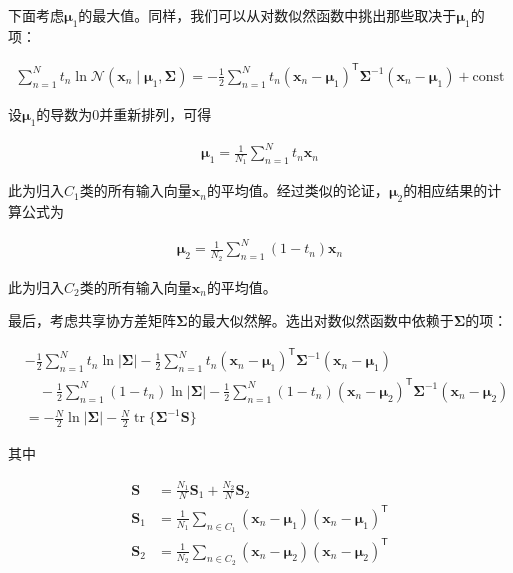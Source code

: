 \documentclass[../../main.tex]{subfiles}
\begin{document}
下面考虑$\boldsymbol{\mu}_1$的最大值。同样，我们可以从对数似然函数中挑出那些取决于$\boldsymbol{\mu}_1$的项：

\begin{align}
  \sum_{n=1}^{N}t_n\ln\mathcal{N}(\boldsymbol{x}_n\mid\boldsymbol{\mu}_1,\boldsymbol{\Sigma})=-\frac{1}{2}\sum_{n=1}^{N}t_n(\boldsymbol{x}_n-\boldsymbol{\mu}_1)^{\mathsf{T}}\boldsymbol{\Sigma}^{-1}(\boldsymbol{x}_n-\boldsymbol{\mu}_1)+\text{const}
  \label{align:ch05-均值项}
\end{align}

设$\boldsymbol{\mu}_1$的导数为0并重新排列，可得

\begin{align}
  \boldsymbol{\mu}_1=\frac{1}{N_1}\sum_{n=1}^{N}t_n\boldsymbol{x}_n
  \label{align:ch05-均值ML1}
\end{align}

此为归入$C_1$类的所有输入向量$\boldsymbol{x}_n$的平均值。经过类似的论证，$\boldsymbol{\mu}_2$的相应结果的计算公式为

\begin{align}
  \boldsymbol{\mu}_2=\frac{1}{N_2}\sum_{n=1}^{N}(1-t_n)\boldsymbol{x}_n
  \label{align:ch05-均值ML2}
\end{align}

此为归入$C_2$类的所有输入向量$\boldsymbol{x}_n$的平均值。

最后，考虑共享协方差矩阵$\boldsymbol{\Sigma}$的最大似然解。选出对数似然函数中依赖于$\boldsymbol{\Sigma}$的项：

\begin{align}
  &-\frac{1}{2}\sum_{n=1}^{N}t_n\ln\lvert\boldsymbol{\Sigma}\rvert-\frac{1}{2}\sum_{n=1}^{N}t_n(\boldsymbol{x}_n-\boldsymbol{\mu}_1)^{\mathsf{T}}\boldsymbol{\Sigma}^{-1}(\boldsymbol{x}_n-\boldsymbol{\mu}_1)\nonumber\\
  &\quad-\frac{1}{2}\sum_{n=1}^{N}(1-t_n)\ln\lvert\boldsymbol{\Sigma}\rvert-\frac{1}{2}\sum_{n=1}^{N}(1-t_n)(\boldsymbol{x}_n-\boldsymbol{\mu}_2)^{\mathsf{T}}\boldsymbol{\Sigma}^{-1}(\boldsymbol{x}_n-\boldsymbol{\mu}_2)\nonumber\\
  &=-\frac{N}{2}\ln\lvert\boldsymbol{\Sigma}\rvert-\frac{N}{2}\operatorname{tr}\bigl\{\boldsymbol{\Sigma}^{-1}\boldsymbol{S}\bigr\}
  \label{align:ch05-协方差项}
\end{align}

其中

\begin{align}
  \boldsymbol{S}&=\frac{N_1}{N}\boldsymbol{S}_1+\frac{N_2}{N}\boldsymbol{S}_2
  \label{align:ch05-共享协方差}\\
  \boldsymbol{S}_1&=\frac{1}{N_1}\sum_{n\in C_1}(\boldsymbol{x}_n-\boldsymbol{\mu}_1)(\boldsymbol{x}_n-\boldsymbol{\mu}_1)^{\mathsf{T}}
  \label{align:ch05-类协方差1}\\
  \boldsymbol{S}_2&=\frac{1}{N_2}\sum_{n\in C_2}(\boldsymbol{x}_n-\boldsymbol{\mu}_2)(\boldsymbol{x}_n-\boldsymbol{\mu}_2)^{\mathsf{T}}
  \label{align:ch05-类协方差2}
\end{align}
\end{document}
